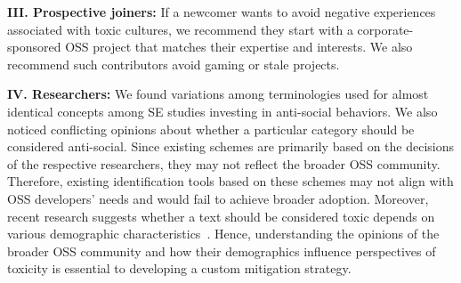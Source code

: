 \vspace{4pt}
\noindent\textbf{III. Prospective joiners: } If a newcomer wants to avoid negative experiences associated with toxic cultures, we recommend they start with a corporate-sponsored OSS project that matches their expertise and interests. We also recommend such contributors avoid gaming or stale projects.

\vspace{4pt}
\noindent \textbf{IV. Researchers:}
We found variations among terminologies used for almost identical concepts among SE studies investing in anti-social behaviors. We also noticed conflicting opinions about whether a particular category should be considered anti-social. Since existing schemes are primarily based on the decisions of the respective researchers, they may not reflect the broader OSS community. Therefore, existing identification tools based on these schemes may not align with OSS developers' needs and would fail to achieve broader adoption. Moreover, recent research suggests whether a text should be considered toxic depends on various demographic characteristics~\cite{goyal2022your}. Hence, understanding the opinions of the broader OSS community and how their demographics influence perspectives of toxicity is essential to developing a custom mitigation strategy. 
